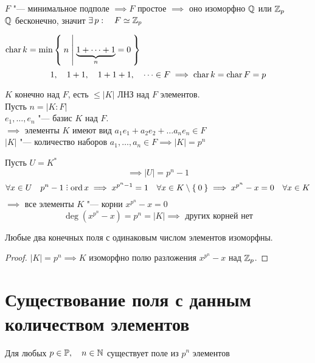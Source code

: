 \begin{eproof}
	\item $ F $ "--- минимальное подполе $ \implies F $ простое $ \implies $ оно изоморфно $ \mathbb{Q} $ или $ \mathbb{Z}_p $ \\
	$ \mathbb{Q} $ бесконечно, значит $ \exists\, p : \quad F \simeq \mathbb{Z}_p $
	\item $ \operatorname{char} k = \min\Set{n | \underbrace{1 + \dots + 1}_n = 0} $
	$$ 1, \quad 1 + 1, \quad 1 + 1 + 1, \quad \dots \in F \implies \operatorname{char} k = \operatorname{char} F = p $$
	\item $ K $ конечно над $ F $, \as есть $ \le |K| $ ЛНЗ над $ F $ элементов. \\
	Пусть $ n = |K : F| $ \\
	$ e_1, \dots, e_n $ "--- базис $ K $ над $ F $. \\
	$ \implies $ элементы $ K $ имеют вид $ a_1e_1 + a_2e_2 + \dots a_ne_n \in F $ \\
	$ |K| $ "--- количество наборов $ a_1, \dots, a_n \in F \implies |K| = p^n $
	\item Пусть $ U = K^* $ 
	$$ \implies |U| = p^n - 1 $$
	$$ \forall x \in U \quad p^n - 1 \divby \ord x \implies x^{p^n - 1} = 1 \quad \forall x \in K \setminus \set{0} \implies x^{p^n} - x = 0 \quad \forall x \in K $$
	$ \implies $ все элементы $ K $ "--- корни $ x^{p^n} - x = 0 $
	$$ \deg(x^{p^n} - x) = p^n = |K| \implies \text{ других корней нет} $$
\end{eproof}

\begin{implication}[единственность]
	Любые два конечных поля с одинаковым числом элементов изоморфны.
\end{implication}

\begin{proof}
	$ |K| = p^n \implies K $ изоморфно полю разложения $ x^{p^n} - x $ над $ \mathbb{Z}_p $.
\end{proof}

\section{Существование поля с данным количеством элементов}

\begin{theorem}
	Для любых $ p \in \mathbb{P}, \quad n \in \mathbb{N} $ существует поле из $ p^n $ элементов
\end{theorem}

